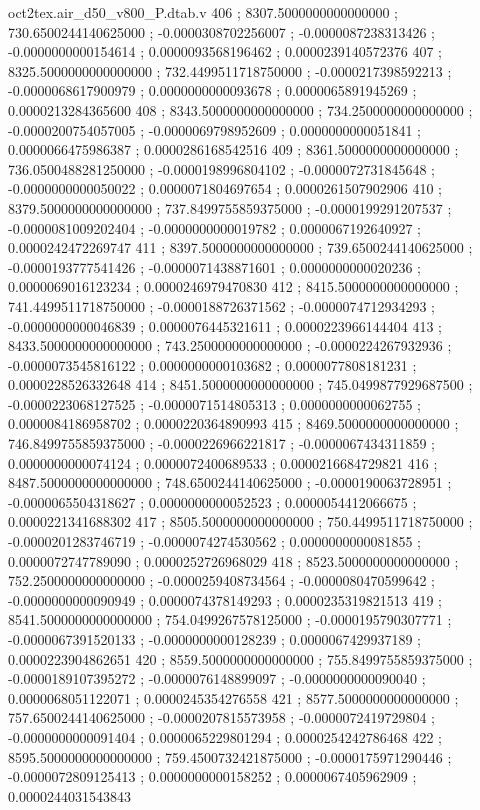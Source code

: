 \begin{filecontents}[overwrite]{oct2tex.air_d50_v800_P.dtab.v}
406 ; 8307.5000000000000000 ; 730.6500244140625000 ; -0.0000308702256007 ; -0.0000087238313426 ; -0.0000000000154614 ; 0.0000093568196462 ; 0.0000239140572376
407 ; 8325.5000000000000000 ; 732.4499511718750000 ; -0.0000217398592213 ; -0.0000068617900979 ; 0.0000000000093678 ; 0.0000065891945269 ; 0.0000213284365600
408 ; 8343.5000000000000000 ; 734.2500000000000000 ; -0.0000200754057005 ; -0.0000069798952609 ; 0.0000000000051841 ; 0.0000066475986387 ; 0.0000286168542516
409 ; 8361.5000000000000000 ; 736.0500488281250000 ; -0.0000198996804102 ; -0.0000072731845648 ; -0.0000000000050022 ; 0.0000071804697654 ; 0.0000261507902906
410 ; 8379.5000000000000000 ; 737.8499755859375000 ; -0.0000199291207537 ; -0.0000081009202404 ; -0.0000000000019782 ; 0.0000067192640927 ; 0.0000242472269747
411 ; 8397.5000000000000000 ; 739.6500244140625000 ; -0.0000193777541426 ; -0.0000071438871601 ; 0.0000000000020236 ; 0.0000069016123234 ; 0.0000246979470830
412 ; 8415.5000000000000000 ; 741.4499511718750000 ; -0.0000188726371562 ; -0.0000074712934293 ; -0.0000000000046839 ; 0.0000076445321611 ; 0.0000223966144404
413 ; 8433.5000000000000000 ; 743.2500000000000000 ; -0.0000224267932936 ; -0.0000073545816122 ; 0.0000000000103682 ; 0.0000077808181231 ; 0.0000228526332648
414 ; 8451.5000000000000000 ; 745.0499877929687500 ; -0.0000223068127525 ; -0.0000071514805313 ; 0.0000000000062755 ; 0.0000084186958702 ; 0.0000220364890993
415 ; 8469.5000000000000000 ; 746.8499755859375000 ; -0.0000226966221817 ; -0.0000067434311859 ; 0.0000000000074124 ; 0.0000072400689533 ; 0.0000216684729821
416 ; 8487.5000000000000000 ; 748.6500244140625000 ; -0.0000190063728951 ; -0.0000065504318627 ; 0.0000000000052523 ; 0.0000054412066675 ; 0.0000221341688302
417 ; 8505.5000000000000000 ; 750.4499511718750000 ; -0.0000201283746719 ; -0.0000074274530562 ; 0.0000000000081855 ; 0.0000072747789090 ; 0.0000252726968029
418 ; 8523.5000000000000000 ; 752.2500000000000000 ; -0.0000259408734564 ; -0.0000080470599642 ; -0.0000000000090949 ; 0.0000074378149293 ; 0.0000235319821513
419 ; 8541.5000000000000000 ; 754.0499267578125000 ; -0.0000195790307771 ; -0.0000067391520133 ; -0.0000000000128239 ; 0.0000067429937189 ; 0.0000223904862651
420 ; 8559.5000000000000000 ; 755.8499755859375000 ; -0.0000189107395272 ; -0.0000076148899097 ; -0.0000000000090040 ; 0.0000068051122071 ; 0.0000245354276558
421 ; 8577.5000000000000000 ; 757.6500244140625000 ; -0.0000207815573958 ; -0.0000072419729804 ; -0.0000000000091404 ; 0.0000065229801294 ; 0.0000254242786468
422 ; 8595.5000000000000000 ; 759.4500732421875000 ; -0.0000175971290446 ; -0.0000072809125413 ; 0.0000000000158252 ; 0.0000067405962909 ; 0.0000244031543843

\end{filecontents}
